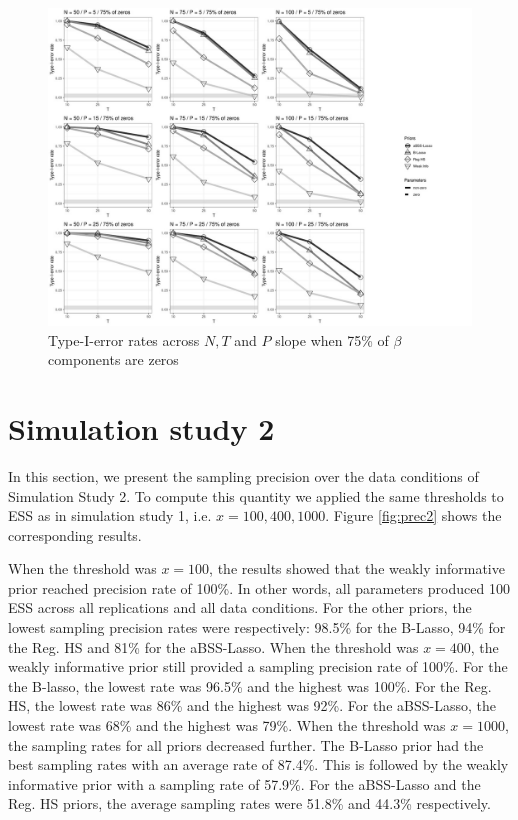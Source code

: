 \documentclass[a4paper,12pt]{article}
\begin{document}
\begin{figure}[]\label{fig:NDR_nz25}
\centering 
\includegraphics[width=18cm]{NDR_nz25_beta.jpg}
\caption{Type-I-error rates across $N, T$ and $P$ slope when 75\% of $\beta$ components are zeros}
\end{figure}

\clearpage
\section{Simulation study 2}

In this section, we present the sampling precision over the data conditions of Simulation Study 2. To compute this quantity we applied the same thresholds to ESS as in simulation study 1, i.e. $x=100,400,1000$. Figure \ref{fig:prec2} shows the corresponding results. 

When the threshold was $x=100$, the results showed that the weakly informative prior reached  precision rate of 100\%. In other words, all parameters produced 100 ESS across all replications and all data conditions. For the other priors, the lowest sampling precision rates were respectively: 98.5\% for the B-Lasso, 94\% for the Reg. HS and 81\% for the aBSS-Lasso. When the threshold was $x=400$, the weakly informative prior still provided a sampling precision rate of 100\%. For the the B-lasso, the lowest rate was 96.5\% and the highest was 100\%. For the Reg. HS, the lowest rate was 86\% and the highest was 92\%. For the aBSS-Lasso, the lowest rate was 68\% and the highest was 79\%. When the threshold was $x=1000$, the sampling rates for all priors decreased further. The B-Lasso prior had the best sampling rates with an average rate of 87.4\%. This is followed by the weakly informative prior with a sampling rate of 57.9\%. For the aBSS-Lasso and the Reg. HS priors, the average sampling rates were 51.8\% and 44.3\% respectively.   \\
\end{document}
